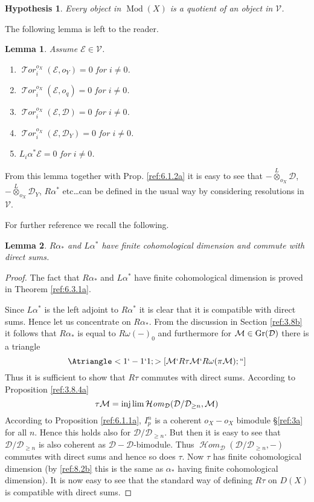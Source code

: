 \documentclass{amsproc}
\def\Dscr{{\mathcal D}}
\def\Escr{{\mathcal E}}
\def\Hscr{{\mathcal H}}
\def\Mscr{{\mathcal M}}
\def\Tscr{{\mathcal T}}
\def\Vscr{{\mathcal V}}
\def\Lotimes{\overset{L}{\otimes}}
\def\HHom{\operatorname {\Hscr \mathit{om}}}
\def\Lotimes{\overset{L}{\otimes}}
\def\HTor{\operatorname {\Tscr \mathit{or}}}
\def\Gr{\mathop{\text{Gr}}}
\def\HHom{\operatorname {\Hscr \mathit{om}}}
\def\HTor{\operatorname {\Tscr \mathit{or}}}
\def\Qch{\operatorname {Mod}}
\let\oldtext\text
\def\text#1{\oldtext{\upshape #1}}
\newtheorem{lemmas}{Lemma}[subsection]
\newtheorem{hypothesis}{Hypothesis}
\theoremstyle{definition}
\theoremstyle{remark}
\numberwithin{equation}{section}
\numberwithin{table}{section}
\numberwithin{figure}{section}
\def\Gr{\mathop{\text{Gr}}}
\begin{document}
{\def\thehypothesis{(**)}
\begin{hypothesis} Every object in $\Qch(X)$ is a quotient of an
  object in $\Vscr$.
\end{hypothesis}
}

 The following lemma is left to the reader.
\begin{lemmas} 
\label{ref:8.2.1a}
Assume $\Escr\in \Vscr$.
\begin{enumerate}
\item
$\HTor_i^{o_X}(\Escr,o_Y)=0$ for $i\neq 0$.
\item
$\HTor_i^{o_X}(\Escr,o_q)=0$ for $i\neq 0$.
\item
 $\HTor_i^{o_X}(\Escr,\Dscr)=0$ for $i\neq 0$.
\item
$\HTor_i^{o_X}(\Escr,\Dscr_Y)=0$ for $i\neq 0$.
\item
$L_i\alpha^\ast \Escr=0$ for  $i\neq 0$.
\end{enumerate}
\end{lemmas}
From this lemma together with Prop. \ref{ref:6.1.2a} it is easy
to see that $-\Lotimes_{o_X} \Dscr$, $-\Lotimes_{o_X} \Dscr_Y$,
$R\alpha^\ast$ etc\dots can be defined in the usual way \cite{RD} by
considering resolutions in $\Vscr$.

For further reference we recall the following.
\begin{lemmas}
\label{ref:8.2.2a} $R\alpha_\ast$ and $L\alpha^\ast$
 have finite cohomological dimension and commute with
direct sums.
\end{lemmas} 
\begin{proof} 
  The fact that $R\alpha_\ast$ and $L\alpha^\ast$ have finite
  cohomological dimension is proved in Theorem
  \ref{ref:6.3.1a}.

  Since $L\alpha^\ast$ is the left adjoint to $R\alpha^\ast$ it is
  clear that it is compatible with direct sums. Hence let us
  concentrate on $R\alpha_\ast$. From the discussion in Section
  \ref{ref:3.8b}  it follows that
  $R\alpha_\ast$ is equal to $R\omega(-)_0$ and furthermore for
  $\Mscr\in\Gr(\Dscr)$ there is a triangle
\begin{equation}
\label{ref:8.2b}
\Atriangle<1`-1`1; >[\Mscr`R\tau\Mscr`R\omega(\pi\Mscr);``]
\end{equation}
Thus it is sufficient to show that $R\tau$ commutes with direct
sums. According to Proposition \ref{ref:3.8.4a}
\[
\tau \Mscr=\injlim \HHom_{\Dscr}(\Dscr/\Dscr_{\ge n},\Mscr)
\]
According to Proposition \ref{ref:6.1.1a}, $I^n_p$ is a
coherent $o_X-o_X$ bimodule \S\ref{ref:3a} for all $n$. Hence this
holds also for $\Dscr/\Dscr_{\ge n}$. But then it is easy to see that
$\Dscr/\Dscr_{\ge n}$ is also coherent as $\Dscr-\Dscr$-bimodule. Thus
$\HHom_{\Dscr}(\Dscr/\Dscr_{\ge n},-)$ commutes with direct sums and
hence so does $\tau$. Now $\tau$ has finite cohomological dimension
(by \eqref{ref:8.2b} this is the same as $\alpha_\ast$ having finite
cohomological dimension).  It is now easy to see that the standard way
of defining $R\tau$ on $D(X)$ \cite{RD} is compatible with direct
sums.
\end{proof}
\end{document}
